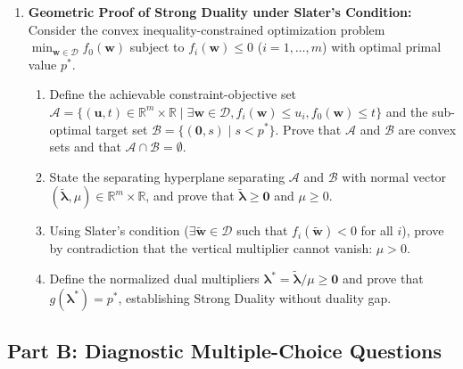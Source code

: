 \begin{enumerate}[label=\textbf{P\arabic*.}]
    \item \textbf{Geometric Proof of Strong Duality under Slater's Condition:}
    Consider the convex inequality-constrained optimization problem $\min_{\mathbf{w} \in \mathcal{D}} f_0(\mathbf{w})$ subject to $f_i(\mathbf{w}) \le 0$ ($i = 1, \dots, m$) with optimal primal value $p^*$.
    \begin{enumerate}[label=(\alph*)]
        \item Define the achievable constraint-objective set $\mathcal{A} = \{(\mathbf{u}, t) \in \mathbb{R}^m \times \mathbb{R} \mid \exists \mathbf{w} \in \mathcal{D}, f_i(\mathbf{w}) \le u_i, f_0(\mathbf{w}) \le t\}$ and the sub-optimal target set $\mathcal{B} = \{(\mathbf{0}, s) \mid s < p^*\}$. Prove that $\mathcal{A}$ and $\mathcal{B}$ are convex sets and that $\mathcal{A} \cap \mathcal{B} = \emptyset$.
        \item State the separating hyperplane separating $\mathcal{A}$ and $\mathcal{B}$ with normal vector $(\tilde{\boldsymbol{\lambda}}, \mu) \in \mathbb{R}^m \times \mathbb{R}$, and prove that $\tilde{\boldsymbol{\lambda}} \ge \mathbf{0}$ and $\mu \ge 0$.
        \item Using Slater's condition ($\exists \tilde{\mathbf{w}} \in \mathcal{D}$ such that $f_i(\tilde{\mathbf{w}}) < 0$ for all $i$), prove by contradiction that the vertical multiplier cannot vanish: $\mu > 0$.
        \item Define the normalized dual multipliers $\boldsymbol{\lambda}^* = \tilde{\boldsymbol{\lambda}} / \mu \ge \mathbf{0}$ and prove that $g(\boldsymbol{\lambda}^*) = p^*$, establishing Strong Duality without duality gap.
    \end{enumerate}
\end{enumerate}

\subsection*{Part B: Diagnostic Multiple-Choice Questions}

